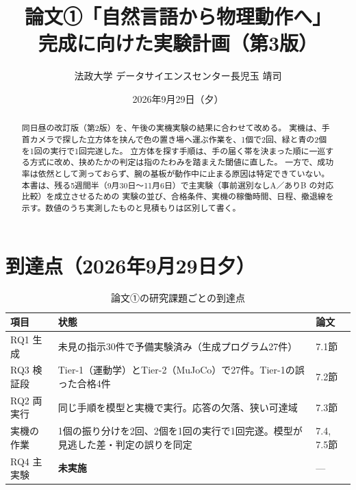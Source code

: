 \documentclass[11pt,a4paper]{article}
\title{\vspace{-12mm}\bfseries 論文①「自然言語から物理動作へ」\\[2mm]
\large 完成に向けた実験計画（第3版）}
\author{法政大学 データサイエンスセンター長\quad 児玉 靖司}
\date{2026年9月29日（夕）}
\begin{document}
\maketitle
\thispagestyle{fancy}

\begin{abstract}
\noindent
同日昼の改訂版（第2版）を、午後の実機実験の結果に合わせて改める。
実機は、手首カメラで探した立方体を挟んで色の置き場へ運ぶ作業を、1個で2回、緑と青の2個を1回の実行で1回完遂した。
立方体を探す手順は、手の届く帯を決まった順に一巡する方式に改め、挟めたかの判定は指のたわみを踏まえた閾値に直した。
一方で、成功率は依然として測っておらず、腕の基板が動作中に止まる原因は特定できていない。
本書は、残る5週間半（9月30日〜11月6日）で主実験（事前選別なしA／ありB の対応比較）を成立させるための
実験の並び、合格条件、実機の稼働時間、日程、撤退線を示す。数値のうち実測したものと見積もりは区別して書く。
\end{abstract}

\section{到達点（2026年9月29日夕）}

\begin{table}[h]\centering\small
\caption{論文①の研究課題ごとの到達点}
\begin{tabularx}{\textwidth}{@{}lYl@{}}
\toprule
項目 & 状態 & 論文 \\
\midrule
RQ1 生成 & 未見の指示30件で予備実験済み（生成プログラム27件） & 7.1節 \\
RQ3 検証段 & Tier-1（運動学）とTier-2（MuJoCo）で27件。Tier-1の誤った合格4件 & 7.2節 \\
RQ2 両実行 & 同じ手順を模型と実機で実行。応答の欠落、狭い可達域 & 7.3節 \\
実機の作業 & 1個の振り分けを2回、2個を1回の実行で1回完遂。模型が見逃した差・判定の誤りを同定 & 7.4, 7.5節 \\
RQ4 主実験 & \textbf{未実施} & --- \\
\bottomrule
\end{tabularx}
\end{table}
\end{document}
